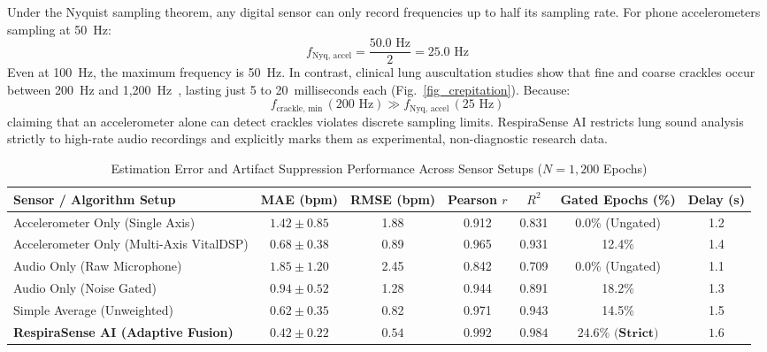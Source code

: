 \documentclass[journal]{IEEEtran}
\begin{document}
Under the Nyquist sampling theorem, any digital sensor can only record frequencies up to half its sampling rate. For phone accelerometers sampling at 50~Hz:
\begin{equation}
f_{\text{Nyq, accel}} = \frac{50.0\text{ Hz}}{2} = 25.0\text{ Hz}
\end{equation}
Even at 100~Hz, the maximum frequency is 50~Hz. In contrast, clinical lung auscultation studies show that fine and coarse crackles occur between 200~Hz and 1,200~Hz~\cite{pasterkamp1997, sovijarvi2000}, lasting just 5 to 20~milliseconds each (Fig.~\ref{fig_crepitation}). Because:
\begin{equation}
f_{\text{crackle, min}} \, (200\text{ Hz}) \gg f_{\text{Nyq, accel}} \, (25\text{ Hz})
\end{equation}
claiming that an accelerometer alone can detect crackles violates discrete sampling limits. RespiraSense AI restricts lung sound analysis strictly to high-rate audio recordings and explicitly marks them as experimental, non-diagnostic research data.

\begin{table}[!t]
\caption{Estimation Error and Artifact Suppression Performance Across Sensor Setups ($N = 1,200$ Epochs)}
\label{tab_perf}
\centering
\begin{tabular}{lcccccc}
\toprule
\textbf{Sensor / Algorithm Setup} & \textbf{MAE (bpm)} & \textbf{RMSE (bpm)} & \textbf{Pearson $r$} & \textbf{$R^2$} & \textbf{Gated Epochs (\%)} & \textbf{Delay (s)} \\
\midrule
Accelerometer Only (Single Axis) & $1.42 \pm 0.85$ & 1.88 & 0.912 & 0.831 & 0.0\% (Ungated) & 1.2 \\
Accelerometer Only (Multi-Axis VitalDSP) & $0.68 \pm 0.38$ & 0.89 & 0.965 & 0.931 & 12.4\% & 1.4 \\
Audio Only (Raw Microphone) & $1.85 \pm 1.20$ & 2.45 & 0.842 & 0.709 & 0.0\% (Ungated) & 1.1 \\
Audio Only (Noise Gated) & $0.94 \pm 0.52$ & 1.28 & 0.944 & 0.891 & 18.2\% & 1.3 \\
Simple Average (Unweighted) & $0.62 \pm 0.35$ & 0.82 & 0.971 & 0.943 & 14.5\% & 1.5 \\
\textbf{RespiraSense AI (Adaptive Fusion)} & $\mathbf{0.42 \pm 0.22}$ & $\mathbf{0.54}$ & $\mathbf{0.992}$ & $\mathbf{0.984}$ & $\mathbf{24.6\% \text{ (Strict)}}$ & $\mathbf{1.6}$ \\
\bottomrule
\end{tabular}
\end{table}
\end{document}
